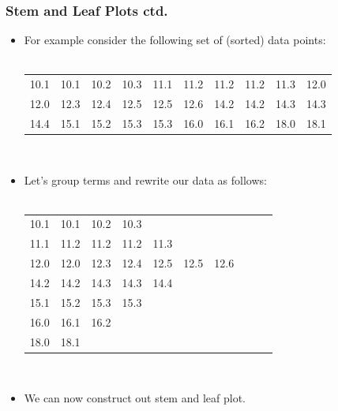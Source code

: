 \documentclass[xcolor=svgnames, compress]{beamer}
\begin{document}
\begin{frame}
\frametitle{Stem and Leaf Plots ctd.}

\footnotesize

\vspace{-0.250cm}

\begin{itemize}
\item	For example consider the following set of (sorted) data points:\\
	\hfill\\
	\hspace*{-20pt}
	\begin{tabular}{c c c c c c c c c c}
	10.1	&	10.1	&	10.2	&	10.3	&	11.1	&	11.2	&	11.2	&	11.2	&	11.3	&	12.0	\\ 
	12.0	&	12.3	&	12.4	&	12.5	&	12.5	&	12.6	&	14.2	&	14.2	&	14.3	&	14.3	\\
	14.4	&	15.1	&	15.2	&	15.3	&	15.3	&	16.0	&	16.1	&	16.2	&	 18.0	&	18.1
	\end{tabular}
\hfill\\
\vspace{0.25cm}
\item	Let's group terms and rewrite our data as follows:\\
\hfill\\
\begin{center}
\begin{tabular}{c c c c c c c c c c}
10.1	&	10.1	&	10.2	&	10.3	\\ 
11.1	&	11.2	&	11.2	&	11.2	&	11.3	\\
12.0	&	12.0	&	12.3	&	12.4	&	12.5	&	12.5	&	12.6	\\
14.2	&	14.2	&	14.3	&	14.3	&	14.4	\\	
15.1	&	15.2	&	15.3	&	15.3	\\
16.0	&	16.1	&	16.2	\\
18.0	&	18.1	\\
\end{tabular}
\end{center}
\hfill\\
\item	We can now construct out stem and leaf plot. 
\end{itemize}

\end{frame}






\end{document}
